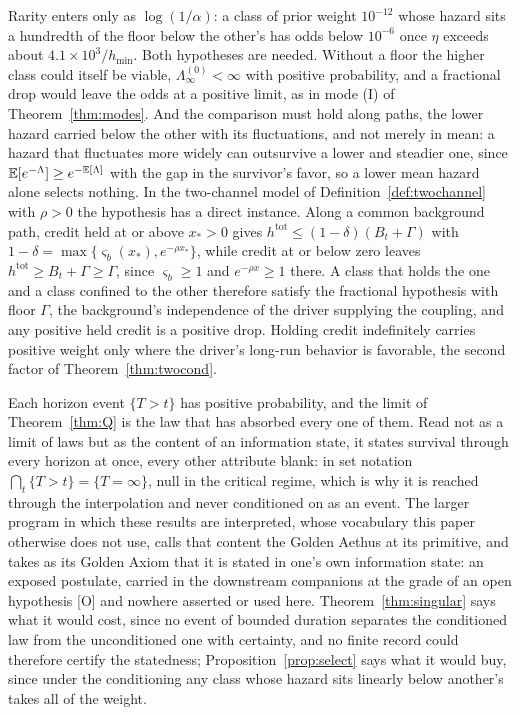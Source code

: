 \begin{remark}\label{rem:select}
Rarity enters only as $\log(1/\alpha)$: a class of prior weight
$10^{-12}$ whose hazard sits a hundredth of the floor below the other's
has odds below $10^{-6}$ once $\eta$ exceeds about $4.1\times10^{3}/h_{\min}$.
Both hypotheses are needed. Without a floor the higher class could
itself be viable, $\Lambda^{(0)}_\infty<\infty$ with positive
probability, and a fractional drop would leave the odds at a positive
limit, as in mode (I) of Theorem~\ref{thm:modes}. And the comparison
must hold along paths, the lower hazard carried below the other with its
fluctuations, and not merely in mean: a hazard that fluctuates more
widely can outsurvive a lower and steadier one, since
$\mathbb{E}[e^{-\Lambda}]\ge e^{-\mathbb{E}[\Lambda]}$ with the gap in the survivor's
favor, so a lower mean hazard alone selects nothing. In the two-channel
model of Definition~\ref{def:twochannel} with $\rho>0$ the hypothesis has
a direct instance. Along a common background path, credit held at or
above $x_\ast>0$ gives $h^{\mathrm{tot}}\le(1-\delta)(B_t+\Gamma)$ with
$1-\delta=\max\{\varsigma_b(x_\ast),e^{-\rho x_\ast}\}$, while credit at
or below zero leaves $h^{\mathrm{tot}}\ge B_t+\Gamma\ge\Gamma$, since
$\varsigma_b\ge1$ and $e^{-\rho x}\ge1$ there. A class that holds the
one and a class confined to the other therefore satisfy the fractional
hypothesis with floor $\Gamma$, the background's independence of the
driver supplying the coupling, and any positive held credit is a
positive drop. Holding credit indefinitely carries positive weight only
where the driver's long-run behavior is favorable, the second factor of
Theorem~\ref{thm:twocond}.
\end{remark}

\begin{remark}
\label{rem:qcontent}
Each horizon event $\{T>t\}$ has positive probability, and the limit of
Theorem~\ref{thm:Q} is the law that has absorbed every one of them. Read
not as a limit of laws but as the content of an information state, it
states survival through every horizon at once, every other attribute
blank: in set notation $\bigcap_t\{T>t\}=\{T=\infty\}$, null in the
critical regime, which is why it is reached through the interpolation
and never conditioned on as an event. The larger program in which these
results are interpreted, whose vocabulary this paper otherwise does not
use, calls that content the Golden Aethus at its primitive, and takes
as its Golden Axiom that it is stated in one's own information state:
an exposed postulate, carried in the downstream companions at the grade
of an open hypothesis {[O]} and nowhere asserted or used here.
Theorem~\ref{thm:singular} says what it would cost, since no event of
bounded duration separates the conditioned law from the unconditioned
one with certainty, and no finite record could therefore certify the
statedness; Proposition~\ref{prop:select} says what it would buy, since
under the conditioning any class whose hazard sits linearly below
another's takes all of the weight.
\end{remark}

